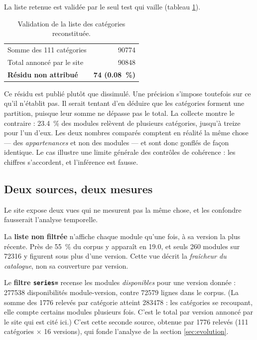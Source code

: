 \documentclass[11pt,a4paper]{article}
\begin{document}
La liste retenue est validée par le seul test qui vaille (tableau
\ref{tab:validation}).

\begin{table}[htbp]
\centering
\caption{Validation de la liste des catégories reconstituée.}
\label{tab:validation}
\begin{tabular}{lr}
\toprule
Somme des \num{111} catégories & \num{90774} \\
Total annoncé par le site      & \num{90848} \\
\midrule
\textbf{Résidu non attribué}   & \textbf{\num{74} (\SI{0.08}{\percent})} \\
\bottomrule
\end{tabular}
\end{table}

Ce résidu est publié plutôt que dissimulé. Une précision s'impose toutefois sur
ce qu'il n'établit pas. Il serait tentant d'en déduire que les catégories
forment une partition, puisque leur somme ne dépasse pas le total. La collecte
montre le contraire : \SI{23.4}{\percent} des modules relèvent de plusieurs
catégories, jusqu'à treize pour l'un d'eux. Les deux nombres comparés comptent
en réalité la même chose --- des \emph{appartenances} et non des modules --- et
sont donc gonflés de façon identique. Le cas illustre une limite générale des
contrôles de cohérence : les chiffres s'accordent, et l'inférence est fausse.

\subsection{Deux sources, deux mesures}
\label{sec:deux-sources}

Le site expose deux vues qui ne mesurent pas la même chose, et les confondre
fausserait l'analyse temporelle.

La \textbf{liste non filtrée} n'affiche chaque module qu'une fois, à sa version
la plus récente. Près de \SI{55}{\percent} du corpus y apparaît en 19.0, et
seuls \num{260} modules sur \num{72316} y figurent sous plus d'une version.
Cette vue décrit la \emph{fraîcheur du catalogue}, non sa couverture par
version.

Le \textbf{filtre \texttt{series=}} recense les modules \emph{disponibles} pour
une version donnée : \num{277538} disponibilités module-version, contre
\num{72579} lignes dans le corpus. (La somme des \num{1776} relevés par
catégorie atteint \num{283478} : les catégories se recoupant, elle compte
certains modules plusieurs fois. C'est le total par version annoncé par le
site qui est cité ici.) C'est cette seconde source, obtenue par
\num{1776} relevés (\num{111} catégories $\times$ \num{16} versions), qui fonde
l'analyse de la section \ref{sec:evolution}.
\end{document}
